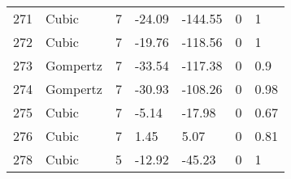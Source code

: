 \documentclass[11pt]{article}
\begin{document}
\begin{center}
\begin{longtable}{lllllll}
    271 & Cubic     & 7               & -24.09  & -144.55 & 0       & 1    \\
    272 & Cubic     & 7               & -19.76  & -118.56 & 0       & 1    \\
    273 & Gompertz  & 7               & -33.54  & -117.38 & 0       & 0.9  \\
    274 & Gompertz  & 7               & -30.93  & -108.26 & 0       & 0.98 \\
    275 & Cubic     & 7               & -5.14   & -17.98  & 0       & 0.67 \\
    276 & Cubic     & 7               & 1.45    & 5.07    & 0       & 0.81 \\
    278 & Cubic     & 5               & -12.92  & -45.23  & 0       & 1   
    \end{tabular}
    \end{table}
    \pagebreak



\end{longtable}
\end{center}
\end{document}
